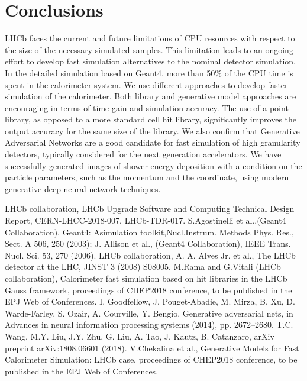 \documentclass{PoS}
\begin{document}
\section {Conclusions}
LHCb faces the current and future limitations of CPU resources with respect to the size of the necessary simulated samples.  This limitation leads to an ongoing effort to develop fast simulation
alternatives to the nominal detector simulation.  In the detailed simulation based on Geant4, more than 50\% of the CPU time is spent in the calorimeter system. We use different approaches to develop faster simulation of the calorimeter.
Both library and generative model approaches are encouraging in terms
of time gain and simulation accuracy.
The use of a point library, as opposed to a more standard cell hit library, significantly improves the output accuracy for the same size of the library.
We also confirm that Generative Adversarial Networks are a good
candidate for fast simulation of high granularity detectors, typically
considered for the next generation accelerators. 
We have successfully generated images of shower energy deposition with
a condition on the particle parameters, such as the momentum and the
coordinate, using modern generative deep neural network techniques.

%

\begin{thebibliography}{99}
LHCb collaboration, LHCb Upgrade Software and
  Computing Technical Design Report, CERN-LHCC-2018-007, LHCb-TDR-017.
S.Agostinelli et al.,(Geant4 Collaboration), Geant4:
  Asimulation toolkit,Nucl.Instrum. Methods Phys. Res., Sect. A 506, 250 (2003); J. Allison et al., (Geant4
  Collaboration), IEEE Trans. Nucl. Sci. 53, 270 (2006).
LHCb collaboration, A. A. Alves Jr. et al., The LHCb detector at the LHC, JINST 3
(2008) S08005.
M.Rama and G.Vitali (LHCb collaboration),
  Calorimeter fast simulation based on hit libraries in the LHCb Gauss
  framework, proceedings of CHEP2018 conference, to be published in the
  EPJ Web of Conferences.
I. Goodfellow, J. Pouget-Abadie, M. Mirza, B. Xu, D. Warde-Farley, S. Ozair,
A. Courville, Y. Bengio, Generative adversarial nets, in Advances in neural information
processing systems (2014), pp. 2672–2680.
T.C. Wang, M.Y. Liu, J.Y. Zhu, G. Liu, A. Tao, J. Kautz, B. Catanzaro, arXiv preprint
arXiv:1808.06601 (2018).
V.Chekalina et al., Generative Models for Fast Calorimeter Simulation: LHCb case, proceedings of CHEP2018 conference, to be published in the
  EPJ Web of Conferences.
\end{thebibliography}
\end{document}
